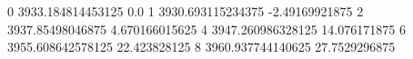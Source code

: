 0 3933.184814453125 0.0
1 3930.693115234375 -2.49169921875
2 3937.85498046875 4.670166015625
4 3947.260986328125 14.076171875
6 3955.608642578125 22.423828125
8 3960.937744140625 27.7529296875
